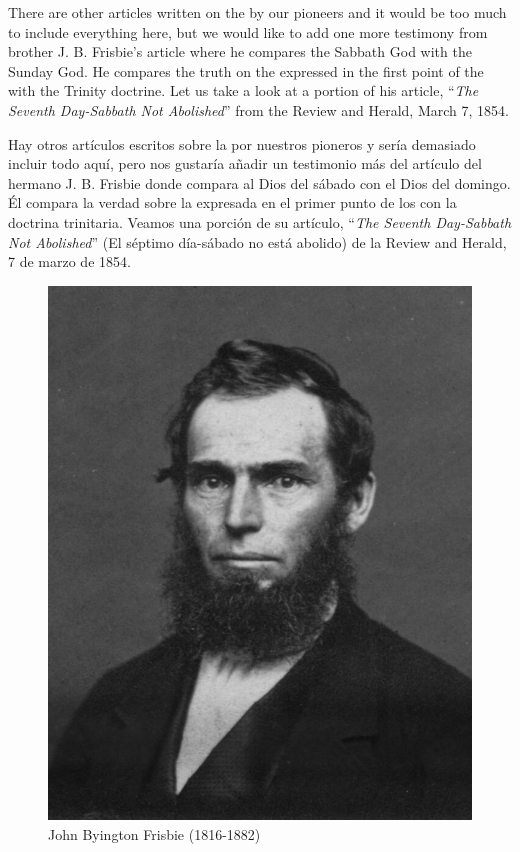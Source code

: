



There are other articles written on the  by our pioneers and it would be too much to include everything here, but we would like to add one more testimony from brother J. B. Frisbie’s article where he compares the Sabbath God with the Sunday God. He compares the truth on the  expressed in the first point of the  with the Trinity doctrine. Let us take a look at a portion of his article, “\textit{The Seventh Day-Sabbath Not Abolished}” from the Review and Herald, March 7, 1854.


Hay otros artículos escritos sobre la  por nuestros pioneros y sería demasiado incluir todo aquí, pero nos gustaría añadir un testimonio más del artículo del hermano J. B. Frisbie donde compara al Dios del sábado con el Dios del domingo. Él compara la verdad sobre la  expresada en el primer punto de los  con la doctrina trinitaria. Veamos una porción de su artículo, “\textit{The Seventh Day-Sabbath Not Abolished}” (El séptimo día-sábado no está abolido) de la Review and Herald, 7 de marzo de 1854.


\begin{figure}[hp]
    \centering
    \includegraphics[width=1\linewidth]{images/j-b-frisbie.jpg}
    \caption*{John Byington Frisbie (1816-1882)}
    \label{fig:j-b-frisbie}
\end{figure}


